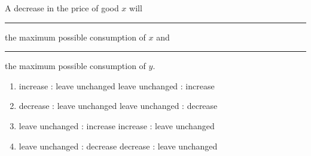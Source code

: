 \begin{question}[type=exam]{4}
  A decrease in the price of good $x$ will \rule{1cm}{0.15mm} the maximum possible consumption of $x$
  and \rule{1cm}{0.15mm} the maximum possible consumption of $y$.
  \begin{enumerate}[label=\alph*), noitemsep]
    \item \vary
      {increase : leave unchanged} %
      {leave unchanged : increase}
    \item \vary
      {decrease : leave unchanged}
      {leave unchanged : decrease}
    \item \vary
      {leave unchanged : increase}
      {increase : leave unchanged} %
    \item \vary
      {leave unchanged : decrease}
      {decrease : leave unchanged}
  \end{enumerate}
\end{question}

